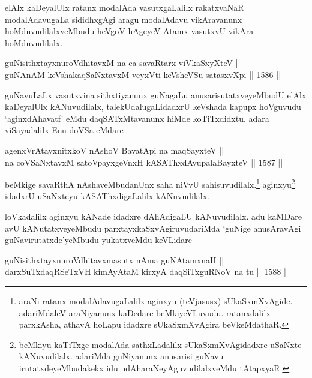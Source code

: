 \begin{artha}
elAlx kaDeyalUlx ratanx modalAda vasutxgaLalilx rakatxvaNaR modalAdavugaLa sididhxgAgi aragu modalAdavu vikAravanunx hoMduvudilalxveMbudu heVgoV hAgeyeV Atamx vasutxvU vikAra hoMduvudilalx.
\end{artha}


\begin{shl}
guNisithxtayxnuroVdhitavxM na ca savaRtarx viVkaSxyXteV || \\
guNAnAM keVshakaqSaNxtavxM veyxVti keVsheVSu satasxvXpi \hfill || 1586 ||  
\end{shl}

\begin{artha}
guNavuLaLx vasutxvina sithxtiyanunx guNagaLu anusarisutatxveyeMbudU elAlx kaDeyalUlx kANuvudilalx, talekUdalugaLidadxrU keVshada kapupx hoVguvudu `aginxdAhavatf' eMdu daqSATxMtavanunx hiMde koTiTxdidxtu. adara viSayadalilx Enu doVSa eMdare-
\end{artha}

\begin{shl}
agenxVrAtayxnitxkoV nAshoV BavatA\s pi na maqSayxteV || \\
na coVSaNxtavxM satoV\s payxgeVnxH kASAThxdAvupalaBayxteV \hfill || 1587 ||  
\end{shl}

\begin{artha}
beMkige savaRthA nAshaveMbudanUnx saha niVvU sahisuvudilalx.\footnote{araNi ratanx modalAdavugaLalilx aginxyu (teVjasusx) sUkaSxmXvAgide. adariMdaleV araNiyanunx kaDedare beMkiyeVLuvudu. ratanxdalilx parxkAsha, athavA hoLapu idadxre sUkaSxmXvAgira beVkeMdathaR.} aginxyu\footnote{beMkiyu kaTiTxge modalAda sathxLadalilx sUkaSxmXvAgidadxre uSaNxte kANuvudilalx. adariMda guNiyanunx anusarisi guNavu irutatxdeyeMbudakekx idu udAharaNeyAguvudilalxveMdu tAtapxyaR.} idadxrU uSaNxteyu kASAThxdigaLalilx kANuvudilalx.
\end{artha}

\begin{artha}
loVkadalilx aginxyu kANade idadxre dAhAdigaLU kANuvudilalx. adu kaMDare avU kANutatxveyeMbudu parxtayxkaSxvAgiruvudariMda `guNige anusAravAgi guNavirutatxde'yeMbudu yukatxveMdu keVLidare-
\end{artha}

\begin{shl}
guNisithxtayxnuroVdhitavxmasutx nAma guNAtamxnaH || \\
darxSuTxdaqRSeTxVH kimAyAtaM kirxyA daqSiTxguRNoV na tu \hfill || 1588 ||  
\end{shl}

